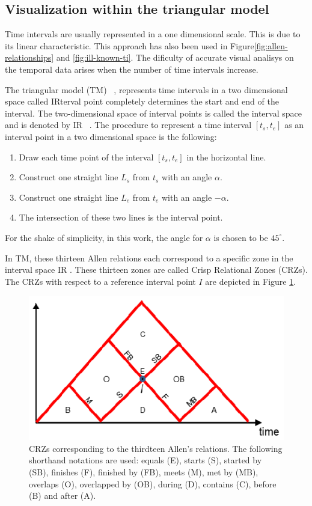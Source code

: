 \subsection{\label{subsec:visualization-tm}Visualization within the triangular model}
Time intervals are usually represented in a one dimensional scale. This is due to its linear characteristic. This approach has also been used in Figure\ref{fig:allen-relationships} and \ref{fig:ill-known-ti}. The dificulty of accurate visual analisys on the temporal data arises when the number of time intervals increase. 

The triangular model (TM) ~\cite{Kulpa1997}, \cite{Weghe2007} represents time intervals in a two dimensional space called IRterval point completely determines the start and end of the interval. The two-dimensional space of interval points is called the interval space and is denoted by IR ~\cite{Kulpa2006}. The procedure to represent a time interval $[t_s, t_e]$ as an interval point in a two dimensional space is the following:

\begin{enumerate}
\item Draw each time point of the interval $[t_s, t_e]$ in the horizontal line.
\item Construct one straight line $L_s$ from $t_s$ with an angle $\alpha$.
\item Construct one straight line $L_e$ from $t_e$ with an angle $-\alpha$.
\item The intersection of these two lines is the interval point.
\end{enumerate}

For the shake of simplicity, in this work, the angle for $\alpha$ is chosen to be $45^{\circ}$.


In TM, these thirteen Allen relations each correspond to a specific zone in the interval space IR \cite{Kulpa1997}. These thirteen zones are called Crisp Relational Zones (CRZs). The CRZs with respect to a reference interval point $I$ are depicted in Figure \ref{fig:allencrz}. 

\begin{figure}[h]
   \centering
   \includegraphics[width=0.8\columnwidth]{graphs/allencrc.eps}
   \caption{CRZs corresponding to the thirdteen Allen's relations. The following shorthand notations are used: equals (E), starts (S), started by (SB), finishes (F), finished by (FB), meets (M), met by (MB), overlaps (O), overlapped by (OB), during (D), contains (C), before (B) and after (A).  }
   \label{fig:allencrz}
 \end{figure}



